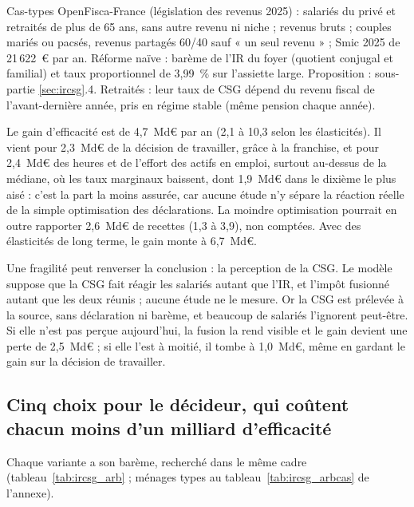 \documentclass[11pt,a4paper]{article}
\begin{document}
\begin{table}[!htbp]
\par\vspace{3pt}\parbox{\linewidth}{\raggedright\scriptsize\color{encre}
Cas-types OpenFisca-France (législation des revenus 2025) : salariés du privé et retraités de plus de 65 ans, sans autre revenu ni niche ; revenus bruts ; couples mariés ou pacsés, revenus partagés 60/40 sauf « un seul revenu » ; Smic 2025 de 21\,622~€ par an. Réforme naïve : barème de l'IR du foyer (quotient conjugal et familial) et taux proportionnel de 3,99~\% sur l'assiette large. Proposition : sous-partie \ref{sec:ircsg}.4. Retraités : leur taux de CSG dépend du revenu fiscal de l'avant-dernière année, pris en régime stable (même pension chaque année).}
\end{table}


Le gain d'efficacité est de 4,7~Md€ par an (2,1 à 10,3 selon les élasticités). Il vient pour 2,3~Md€ de la décision
de travailler, grâce à la franchise, et pour 2,4~Md€ des heures et de l'effort des actifs en emploi, surtout au-dessus
de la médiane, où les taux marginaux baissent, dont 1,9~Md€ dans le dixième le plus aisé : c'est la part la moins
assurée, car aucune étude n'y sépare la réaction réelle de la simple optimisation des déclarations. La moindre
optimisation pourrait en outre rapporter 2,6~Md€ de recettes (1,3 à 3,9), non comptées. Avec des élasticités de long
terme, le gain monte à 6,7~Md€.

Une fragilité peut renverser la conclusion : la perception de la CSG. Le modèle suppose que la CSG fait réagir les
salariés autant que l'IR, et l'impôt fusionné autant que les deux réunis ; aucune étude ne le mesure. Or la CSG est
prélevée à la source, sans déclaration ni barème, et beaucoup de salariés l'ignorent peut-être. Si elle n'est pas perçue
aujourd'hui, la fusion la rend visible et le gain devient une perte de 2,5~Md€ ; si elle l'est à moitié, il tombe à
1,0~Md€, même en gardant le gain sur la décision de travailler.

\subsection{Cinq choix pour le décideur, qui coûtent chacun moins d'un milliard d'efficacité}

Chaque variante a son barème, recherché dans le même cadre (tableau~\ref{tab:ircsg_arb} ; ménages types au
tableau~\ref{tab:ircsg_arbcas} de l'annexe).
\end{document}
